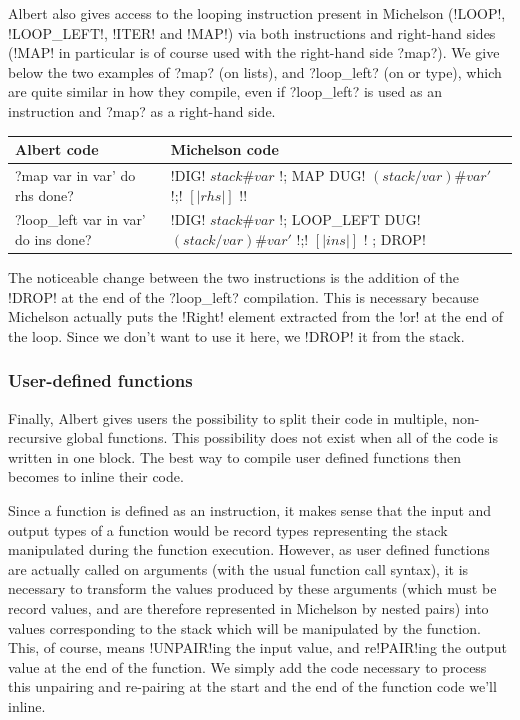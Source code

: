 \documentclass{report}
\begin{document}
Albert also gives access to the looping instruction present in Michelson (!LOOP!, !LOOP_LEFT!, !ITER! and !MAP!) via both instructions and right-hand sides (!MAP! in particular is of course used with the right-hand side ?map?). We give below the two examples of ?map? (on lists), and ?loop_left? (on or type), which are quite similar in how they compile, even if ?loop_left? is used as an instruction and ?map? as a right-hand side.

{\small
\begin{longtable}{p{5cm}|p{11cm}}
  Albert code & Michelson code\\
  \hline
  ?map var in var' do rhs done? & !DIG! $stack\#var$ !; MAP { DUG! $(stack/var)\#var'$ !;! $[|rhs|]$ !}!\\
  \hline
  ?loop_left var in var' do ins done? & !DIG! $stack\#var$ !; LOOP_LEFT { DUG! $(stack/var)\#var'$ !;! $[|ins|]$ !} ; DROP!
\end{longtable}
}

The noticeable change between the two instructions is the addition of the !DROP! at the end of the ?loop_left? compilation. This is necessary because Michelson actually puts the !Right! element extracted from the !or! at the end of the loop. Since we don't want to use it here, we !DROP! it from the stack.

\subsubsection{User-defined functions}
\label{functComp}

Finally, Albert gives users the possibility to split their code in multiple, non-recursive global functions. This possibility does not exist when all of the code is written in one block. The best way to compile user defined functions then becomes to inline their code.

Since a function is defined as an instruction, it makes sense that the input and output types of a function would be record types representing the stack manipulated during the function execution. However, as user defined functions are actually called on arguments (with the usual function call syntax), it is necessary to transform the values produced by these arguments (which must be record values, and are therefore represented in Michelson by nested pairs) into values corresponding to the stack which will be manipulated by the function. This, of course, means !UNPAIR!ing the input value, and re!PAIR!ing the output value at the end of the function. We simply add the code necessary to process this unpairing and re-pairing at the start and the end of the function code we'll inline.\\
\end{document}
